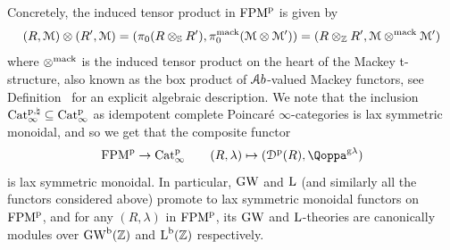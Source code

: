 Concretely, the induced tensor product in $\mathrm {FPM}^{\mathrm p}$ is given by 
\[
(R,\mathcal{M})\otimes (R',\mathcal{M}) = (\pi_0(R \otimes_{\mathbb{S}} R'),\pi^{\mathrm{mack}}_0(\mathcal{M}\otimes\mathcal{M}')) = (R\otimes_{\mathbb{Z}} R',\mathcal{M}\otimes^{\mathrm{mack}} \mathcal{M}')
\]
where $\otimes^{\mathrm{mack}}$ is the induced tensor product on the heart of the Mackey t-structure, also known as the box product of $\mathcal{A}b$-valued Mackey functors, see Definition~ for an explicit algebraic description. We note that the inclusion $\mathrm{Cat}^{\mathrm p,\natural}_{\infty} \subseteq \mathrm{Cat}^{\mathrm p}_\infty$ as idempotent complete Poincaré $\infty$-categories is lax symmetric monoidal, and so we get that the composite functor
\[
\FPMp \to \Catp \quad\quad (R,\lambda) \mapsto (\Dperf(R),\QF^{\g\lambda})
\]
is lax symmetric monoidal.
In particular, $\operatorname{GW}$ and $\operatorname L$ (and similarly all the functors considered above) promote to lax symmetric monoidal functors on $\mathrm {FPM}^{\mathrm p}$, and for any $(R, \lambda)$ in $\mathrm {FPM}^{\mathrm p}$, its $\operatorname{GW}$ and $\operatorname L$-theories are canonically modules over $\operatorname{GW}^{\mathrm{b}}(\mathbb{Z})$ and $\operatorname L^{\mathrm{b}}(\mathbb{Z})$ respectively. 
 
